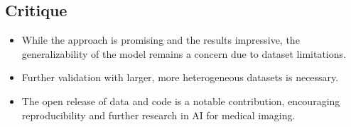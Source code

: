 \subsection*{Critique}
\begin{itemize}
    \item While the approach is promising and the results impressive, the generalizability of the model remains a concern due to dataset limitations.
    \item Further validation with larger, more heterogeneous datasets is necessary.
    \item The open release of data and code is a notable contribution, encouraging reproducibility and further research in AI for medical imaging.
\end{itemize}

